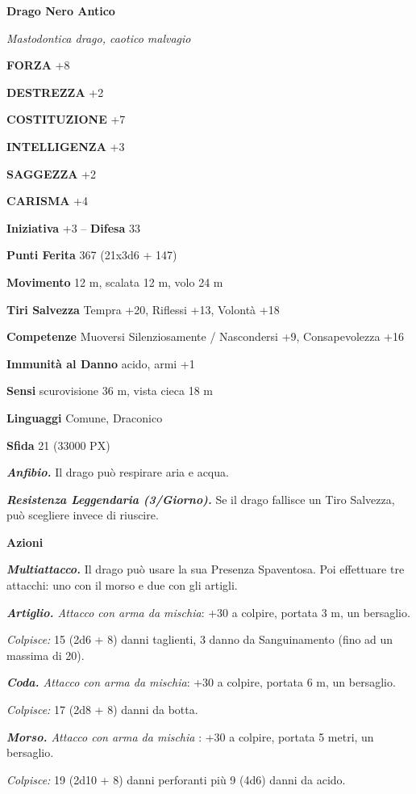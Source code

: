 \begin{multicols}{2}
\medskip{}\textbf{Drago Nero Antico}

\textit{Mastodontica drago, caotico malvagio}

\textbf{FORZA} +8

\textbf{DESTREZZA} +2

\textbf{COSTITUZIONE} +7

\textbf{INTELLIGENZA} +3

\textbf{SAGGEZZA} +2

\textbf{CARISMA} +4

\textbf{Iniziativa} +3 -- \textbf{Difesa} 33

\textbf{Punti Ferita} 367 (21x3d6 + 147)

\textbf{Movimento} 12 m, scalata 12 m, volo 24 m

\textbf{Tiri Salvezza} Tempra +20, Riflessi +13, Volontà +18

\textbf{Competenze} Muoversi Silenziosamente / Nascondersi +9, Consapevolezza +16

\textbf{Immunità al Danno} acido, armi +1

\textbf{Sensi} scurovisione 36 m, vista cieca 18 m

\textbf{Linguaggi} Comune, Draconico

\textbf{Sfida} 21 (33000 PX)

\textit{\textbf{Anfibio.}} Il drago può respirare aria e acqua.

\textit{\textbf{Resistenza Leggendaria (3/Giorno).}} Se il drago fallisce un Tiro Salvezza, può scegliere invece di riuscire.

\textbf{Azioni}

\textit{\textbf{Multiattacco.}} Il drago può usare la sua Presenza Spaventosa. Poi effettuare tre attacchi: uno con il morso e due con gli artigli.

\textit{\textbf{Artiglio.} Attacco con arma da mischia}: +30 a colpire, portata 3 m, un bersaglio.

\textit{Colpisce:} 15 (2d6 + 8) danni taglienti, 3 danno da Sanguinamento (fino ad un massima di 20).

\textit{\textbf{Coda.} Attacco con arma da mischia}: +30 a colpire, portata 6 m, un bersaglio.

\textit{Colpisce:} 17 (2d8 + 8) danni da botta.

\textit{\textbf{Morso.} Attacco con arma da mischia} : +30 a colpire, portata 5 metri, un bersaglio.

\textit{Colpisce:} 19 (2d10 + 8) danni perforanti più 9 (4d6) danni da acido.


\end{multicols}
